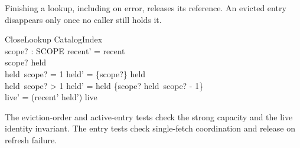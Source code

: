 \documentclass[a4paper,10pt,fleqn]{article}
\begin{document}
Finishing a lookup, including on error, releases its reference. An evicted
entry disappears only once no caller still holds it.

\begin{schema}{CloseLookup}
  \Delta CatalogIndex \\
  scope? : SCOPE
\where
  recent' = recent \\
  scope? \in \dom held \\
  held~scope? = 1 \implies held' = \{scope?\} \ndres held \\
  held~scope? > 1 \implies
    held' = held \oplus \{scope? \mapsto held~scope? - 1\} \\
  live' = (\ran recent' \cup \dom held') \dres live
\end{schema}

The eviction-order and active-entry tests check the strong capacity and the
live identity invariant. The entry tests check single-fetch coordination and
release on refresh failure.
\end{document}
